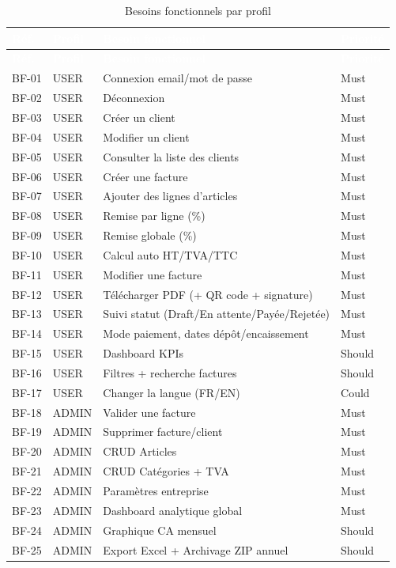 \begin{longtable}{|l|l|X|l|}
\caption{Besoins fonctionnels par profil} \label{tab:bf_profil} \\
\hline
\rowcolor{emsiblue}\textcolor{white}{\textbf{Réf.}} & \textcolor{white}{\textbf{Profil}} & \textcolor{white}{\textbf{Besoin fonctionnel}} & \textcolor{white}{\textbf{Priorité}} \\
\hline
\endfirsthead
\hline
\rowcolor{emsiblue}\textcolor{white}{\textbf{Réf.}} & \textcolor{white}{\textbf{Profil}} & \textcolor{white}{\textbf{Besoin fonctionnel}} & \textcolor{white}{\textbf{Priorité}} \\
\hline
\endhead
BF-01 & USER & Connexion email/mot de passe & Must \\
BF-02 & USER & Déconnexion & Must \\
BF-03 & USER & Créer un client & Must \\
BF-04 & USER & Modifier un client & Must \\
BF-05 & USER & Consulter la liste des clients & Must \\
BF-06 & USER & Créer une facture & Must \\
BF-07 & USER & Ajouter des lignes d'articles & Must \\
BF-08 & USER & Remise par ligne (\%) & Must \\
BF-09 & USER & Remise globale (\%) & Must \\
BF-10 & USER & Calcul auto HT/TVA/TTC & Must \\
BF-11 & USER & Modifier une facture & Must \\
BF-12 & USER & Télécharger PDF (+ QR code + signature) & Must \\
BF-13 & USER & Suivi statut (Draft/En attente/Payée/Rejetée) & Must \\
BF-14 & USER & Mode paiement, dates dépôt/encaissement & Must \\
BF-15 & USER & Dashboard KPIs & Should \\
BF-16 & USER & Filtres + recherche factures & Should \\
BF-17 & USER & Changer la langue (FR/EN) & Could \\
BF-18 & ADMIN & Valider une facture & Must \\
BF-19 & ADMIN & Supprimer facture/client & Must \\
BF-20 & ADMIN & CRUD Articles & Must \\
BF-21 & ADMIN & CRUD Catégories + TVA & Must \\
BF-22 & ADMIN & Paramètres entreprise & Must \\
BF-23 & ADMIN & Dashboard analytique global & Must \\
BF-24 & ADMIN & Graphique CA mensuel & Should \\
BF-25 & ADMIN & Export Excel + Archivage ZIP annuel & Should \\
\hline
\end{longtable}

